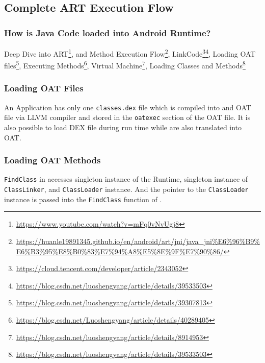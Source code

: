 \label{task:20240402_aosp}

\subsection{Complete ART Execution Flow}

\subsubsection{How is Java Code loaded into Android Runtime?}

Deep Dive into ART\footnote{\url{https://www.youtube.com/watch?v=mFq0vNvUgj8}}, and Method Execution Flow\footnote{\url{https://huanle19891345.github.io/en/android/art/jni/java_jni\%E6\%96\%B9\%E6\%B3\%95\%E8\%B0\%83\%E7\%94\%A8\%E5\%8E\%9F\%E7\%90\%86/}}, LinkCode\footnote{\url{https://cloud.tencent.com/developer/article/2343052}}\footnote{\url{https://blog.csdn.net/luoshengyang/article/details/39533503}}, Loading OAT files\footnote{\url{https://blog.csdn.net/luoshengyang/article/details/39307813}}, Executing Methods\footnote{\url{https://blog.csdn.net/Luoshengyang/article/details/40289405}}, Virtual Machine\footnote{\url{https://blog.csdn.net/luoshengyang/article/details/8914953}}, Loading Classes and Methods\footnote{\url{https://blog.csdn.net/luoshengyang/article/details/39533503}}

\subsubsection{Loading OAT Files}

An Application has only one \texttt{classes.dex} file which is compiled into and OAT file via LLVM compiler and stored in the \texttt{oatexec} section of the OAT file. It is also possible to load DEX file during run time while are also translated into OAT.

\subsubsection{Loading OAT Methods}

\texttt{FindClass} in  accesses singleton instance of the Runtime, singleton instance of \texttt{ClassLinker}, and \texttt{ClassLoader} instance. And the pointer to the \texttt{ClassLoader} instance is passed into the \texttt{FindClass} function of .



% 

